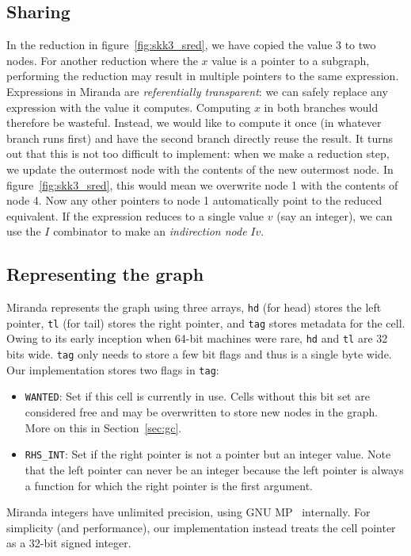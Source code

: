 \documentclass[conference]{IEEEtran}
\begin{document}
\subsection{Sharing}
In the reduction in figure~\ref{fig:skk3_sred}, we have copied the value $3$ to two nodes.
For another reduction where the $x$ value is a pointer to a subgraph, performing the reduction may result in multiple pointers to the same expression.
Expressions in Miranda are \textit{referentially transparent}: we can safely replace any expression with the value it computes.
Computing $x$ in both branches would therefore be wasteful.
Instead, we would like to compute it once (in whatever branch runs first) and have the second branch directly reuse the result.
It turns out that this is not too difficult to implement: when we make a reduction step, we update the outermost node with the contents of the new outermost node.
In figure~\ref{fig:skk3_sred}, this would mean we overwrite node 1 with the contents of node 4.
Now any other pointers to node 1 automatically point to the reduced equivalent.
If the expression reduces to a single value $v$ (say an integer), we can use the $I$ combinator to make an \textit{indirection node} $I v$.

\subsection{Representing the graph}
Miranda represents the graph using three arrays, \texttt{hd} (for head) stores the left pointer, \texttt{tl} (for tail) stores the right pointer, and \texttt{tag} stores metadata for the cell.
Owing to its early inception when 64-bit machines were rare, \texttt{hd} and \texttt{tl} are 32 bits wide.
\texttt{tag} only needs to store a few bit flags and thus is a single byte wide.
Our implementation stores two flags in \texttt{tag}:
\begin{itemize}
    \item \texttt{WANTED}: Set if this cell is currently in use. Cells without this bit set are considered free and may be overwritten to store new nodes in the graph. More on this in Section~\ref{sec:gc}.
    \item \texttt{RHS\_INT}: Set if the right pointer is not a pointer but an integer value. Note that the left pointer can never be an integer because the left pointer is always a function for which the right pointer is the first argument.
\end{itemize}

Miranda integers have unlimited precision, using GNU MP~\cite{gnump} internally.
For simplicity (and performance), our implementation instead treats the cell pointer as a 32-bit signed integer.
\end{document}
